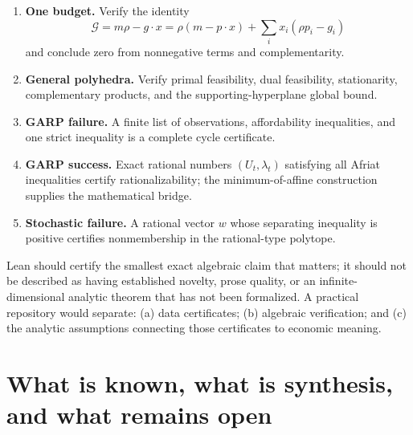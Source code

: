 \documentclass[11pt]{article}
\newcommand{\cG}{\mathcal{G}}
\theoremstyle{definition}
\theoremstyle{remark}
\begin{document}
\begin{enumerate}
  \item \textbf{One budget.}  Verify the identity
  \[
    \cG=m\rho-g\cdot x
    =\rho(m-p\cdot x)+\sum_i x_i(\rho p_i-g_i)
  \]
  and conclude zero from nonnegative terms and complementarity.
  \item \textbf{General polyhedra.}  Verify primal feasibility, dual feasibility, stationarity,
  complementary products, and the supporting-hyperplane global bound.
  \item \textbf{GARP failure.}  A finite list of observations, affordability inequalities, and one
  strict inequality is a complete cycle certificate.
  \item \textbf{GARP success.}  Exact rational numbers $(U_t,\lambda_t)$ satisfying all Afriat
  inequalities certify rationalizability; the minimum-of-affine construction supplies the
  mathematical bridge.
  \item \textbf{Stochastic failure.}  A rational vector $w$ whose separating inequality is positive
  certifies nonmembership in the rational-type polytope.
\end{enumerate}

Lean should certify the smallest exact algebraic claim that matters; it should not be described as
having established novelty, prose quality, or an infinite-dimensional analytic theorem that has not
been formalized.  A practical repository would separate: (a) data certificates; (b) algebraic
verification; and (c) the analytic assumptions connecting those certificates to economic meaning.

\section{What is known, what is synthesis, and what remains open}
\end{document}
